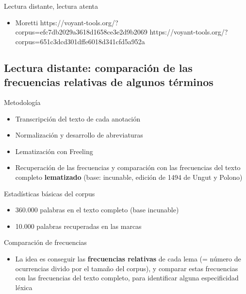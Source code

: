 \documentclass[11pt,aspectratio=169]{beamer}
\begin{document}
\begin{frame}{Lectura distante, lectura atenta}
\begin{center}
\begin{itemize}
\item Moretti
https://voyant-tools.org/?corpus=efc7db2029a3618d1658ce3e2d9b2069
https://voyant-tools.org/?corpus=651c3dcd301dffe6018d341cfd5a952a
\end{itemize}
\end{center}
\end{frame}



\subsection{Lectura distante: comparación de las frecuencias relativas de algunos términos}


\begin{frame}{Metodología}
\begin{center}
\begin{itemize}
\item Transcripción del texto de cada anotación
\item Normalización y desarrollo de abreviaturas
\item Lematización con Freeling
\item Recuperación de las frecuencias y comparación con las frecuencias del texto completo \textbf{lematizado} (base: incunable, edición de 1494 de Ungut y Polono)
\end{itemize}
\end{center}
\end{frame}


\begin{frame}{Estadísticas básicas del corpus}
\begin{center}
\begin{itemize}
\item 360.000 palabras en el texto completo (base incunable)
\item 10.000 palabras recuperadas en las marcas
\end{itemize}
\end{center}
\end{frame}


\begin{frame}{Comparación de frecuencias}
\begin{center}
\begin{itemize}
\item La idea es conseguir las \textbf{frecuencias relativas} de cada lema (= número de ocurrencias divido por el tamaño del corpus), y comparar estas frecuencias con las frecuencias del texto completo, para identificar alguna especificidad léxica
\end{itemize}
\end{center}
\end{frame}
\end{document}
